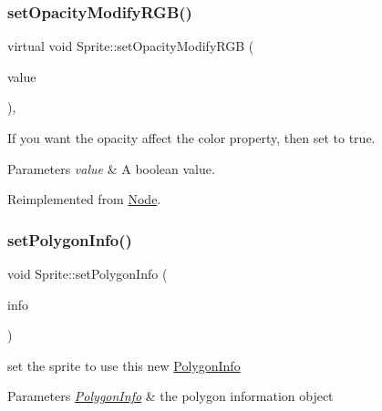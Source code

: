 \subsubsection{\texorpdfstring{set\+Opacity\+Modify\+R\+G\+B()}{setOpacityModifyRGB()}\hspace{0.1cm}{\footnotesize\ttfamily [2/2]}}
{\footnotesize\ttfamily virtual void Sprite\+::set\+Opacity\+Modify\+R\+GB (\begin{DoxyParamCaption}\item[{bool}]{value }\end{DoxyParamCaption})\hspace{0.3cm}{\ttfamily [override]}, {\ttfamily [virtual]}}

If you want the opacity affect the color property, then set to true. 
\begin{DoxyParams}{Parameters}
{\em value} & A boolean value. \\
\hline
\end{DoxyParams}


Reimplemented from \hyperlink{classNode_a978c5435ab23f76e9efdf0f7e9e288e5}{Node}.

\mbox{\label{classSprite_a2ab8f707e76545845606c8de023d4f91}} 
\subsubsection{\texorpdfstring{set\+Polygon\+Info()}{setPolygonInfo()}\hspace{0.1cm}{\footnotesize\ttfamily [1/2]}}
{\footnotesize\ttfamily void Sprite\+::set\+Polygon\+Info (\begin{DoxyParamCaption}\item[{const \hyperlink{classPolygonInfo}{Polygon\+Info} \&}]{info }\end{DoxyParamCaption})}

set the sprite to use this new \hyperlink{classPolygonInfo}{Polygon\+Info}


\begin{DoxyParams}{Parameters}
{\em \hyperlink{classPolygonInfo}{Polygon\+Info}} & the polygon information object \\
\hline
\end{DoxyParams}
\mbox{\label{classSprite_a2ab8f707e76545845606c8de023d4f91}} 
